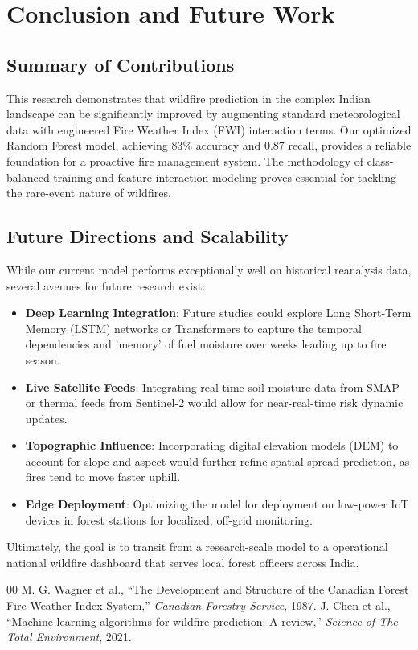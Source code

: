\documentclass[conference]{IEEEtran}
\begin{document}
\section{Conclusion and Future Work}
\subsection{Summary of Contributions}
This research demonstrates that wildfire prediction in the complex Indian landscape can be significantly improved by augmenting standard meteorological data with engineered Fire Weather Index (FWI) interaction terms. Our optimized Random Forest model, achieving 83\% accuracy and 0.87 recall, provides a reliable foundation for a proactive fire management system. The methodology of class-balanced training and feature interaction modeling proves essential for tackling the rare-event nature of wildfires.

\subsection{Future Directions and Scalability}
While our current model performs exceptionally well on historical reanalysis data, several avenues for future research exist:
\begin{itemize}
    \item \textbf{Deep Learning Integration}: Future studies could explore Long Short-Term Memory (LSTM) networks or Transformers to capture the temporal dependencies and 'memory' of fuel moisture over weeks leading up to fire season.
    \item \textbf{Live Satellite Feeds}: Integrating real-time soil moisture data from SMAP or thermal feeds from Sentinel-2 would allow for near-real-time risk dynamic updates.
    \item \textbf{Topographic Influence}: Incorporating digital elevation models (DEM) to account for slope and aspect would further refine spatial spread prediction, as fires tend to move faster uphill.
    \item \textbf{Edge Deployment}: Optimizing the model for deployment on low-power IoT devices in forest stations for localized, off-grid monitoring.
\end{itemize}
Ultimately, the goal is to transit from a research-scale model to a operational national wildfire dashboard that serves local forest officers across India.

\begin{thebibliography}{00}
 M. G. Wagner et al., ``The Development and Structure of the Canadian Forest Fire Weather Index System,'' \textit{Canadian Forestry Service}, 1987.
 J. Chen et al., ``Machine learning algorithms for wildfire prediction: A review,'' \textit{Science of The Total Environment}, 2021.
\end{thebibliography}
\end{document}
